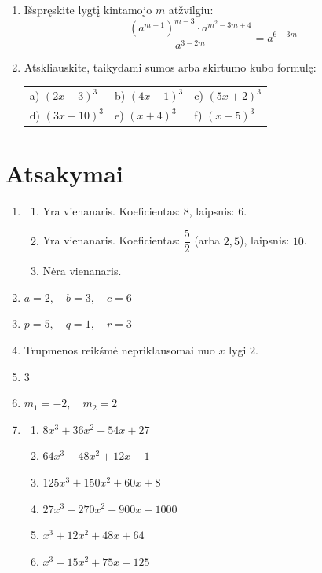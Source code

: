 \documentclass[12pt, a4paper]{article}
\begin{document}
\begin{enumerate}[label=\textbf{\arabic* užduotis.}, leftmargin=*]
    \item Išspręskite lygtį kintamojo $m$ atžvilgiu:
    \[
    \frac{(a^{m+1})^{m-3} \cdot a^{m^2 - 3m + 4}}{a^{3-2m}} = a^{6-3m}
    \]

    \item Atskliauskite, taikydami sumos arba skirtumo kubo formulę:
    \begin{center}
        \begin{tabular*}{\linewidth}{@{\extracolsep{\fill}}lll@{}}
            a) $(2x + 3)^3$ & b) $(4x - 1)^3$ & c) $(5x + 2)^3$ \\
            d) $(3x - 10)^3$ & e) $(x + 4)^3$ & f) $(x - 5)^3$
        \end{tabular*}
    \end{center}
\end{enumerate}

\newpage

\section{Atsakymai}

\begin{enumerate}[label=\textbf{\arabic* užduotis.}, leftmargin=*]
    \item 
    \begin{enumerate}[label=\alph*)]
        \item Yra vienanaris. Koeficientas: $8$, laipsnis: $6$.
        \item Yra vienanaris. Koeficientas: $\dfrac{5}{2}$ (arba $2{,}5$), laipsnis: $10$.
        \item Nėra vienanaris.
    \end{enumerate}

    \item $a = 2, \quad b = 3, \quad c = 6$

    \item $p = 5, \quad q = 1, \quad r = 3$

    \item Trupmenos reikšmė nepriklausomai nuo $x$ lygi $2$.

    \item $3$

    \item $m_1 = -2, \quad m_2 = 2$

    \item
    \begin{enumerate}[label=\alph*)]
        \item $8x^3 + 36x^2 + 54x + 27$
        \item $64x^3 - 48x^2 + 12x - 1$
        \item $125x^3 + 150x^2 + 60x + 8$
        \item $27x^3 - 270x^2 + 900x - 1000$
        \item $x^3 + 12x^2 + 48x + 64$
        \item $x^3 - 15x^2 + 75x - 125$
    \end{enumerate}
\end{enumerate}
\end{document}
